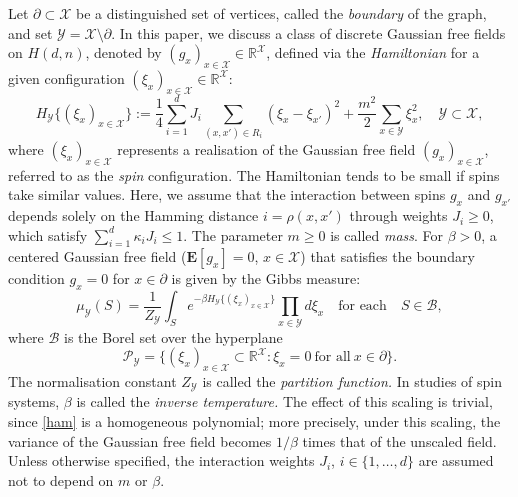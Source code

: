 \documentclass[a4paper,11pt]{article}
\theoremstyle{plain}
\theoremstyle{definition}
\begin{document}
Let $\partial\subset \mathcal{X}$ be a distinguished set
of vertices, called the {\it boundary} of the graph,
and set $\mathcal{Y}=\mathcal{X}\setminus\partial$.
In this paper, we discuss a class of discrete Gaussian
free fields on $H(d,n)$, denoted by
$(g_x)_{x\in\mathcal{X}}\in\mathbb{R}^{\mathcal X}$,
defined via the {\it Hamiltonian}
for a given configuration
$(\xi_x)_{x\in\mathcal{X}}\in\mathbb{R}^\mathcal{X}$:
\begin{equation}\label{ham}
  H_\mathcal{Y}\{(\xi_x)_{x\in\mathcal{X}}\}
  :=\frac{1}{4}\sum_{i=1}^dJ_i\sum_{(x,x')\in R_i}
  (\xi_x-\xi_{x'})^2
  +\frac{m^2}{2}\sum_{x\in \mathcal{Y}}\xi_x^2,
  \quad \mathcal{Y} \subset \mathcal{X},
\end{equation}
where $(\xi_x)_{x\in\mathcal{X}}$
represents a realisation of the Gaussian
free field $(g_x)_{x\in\mathcal{X}}$, referred to as
the {\it spin} configuration. The Hamiltonian tends to
be small if spins take similar values. Here, we assume that
the interaction between spins $g_x$ and $g_{x'}$
depends solely on the Hamming distance
$i=\rho(x,x')$ through weights $J_i\ge 0$, which satisfy
$\sum_{i=1}^d \kappa_i J_i\le 1$. The parameter $m\ge 0$
is called {\it mass}. For $\beta>0$, a centered Gaussian
free field ($\mathbf{E}[g_x]=0$, $x\in\mathcal{X}$) 
that satisfies the boundary condition $g_x=0$ for
$x\in\partial$ is given by the Gibbs measure:
\begin{equation}\label{gibbs}
  \mu_\mathcal{Y}(S)=\frac{1}{Z_\mathcal{Y}}\int_S
  e^{-\beta H_\mathcal{Y}\{(\xi_x)_{x\in\mathcal{X}}\}}
  \prod_{x\in\mathcal{Y}} d\xi_x
  \quad \text{for~each} \quad S\in\mathcal{B},
\end{equation}
where $\mathcal{B}$ is the Borel set over the hyperplane
\begin{equation}\label{plane}
  \mathcal{P}_\mathcal{Y}=\{(\xi_x)_{x\in\mathcal{X}}\subset
  \mathbb{R}^\mathcal{X}:\xi_x=0~\text{for~all}~x\in\partial\}.
\end{equation}
The normalisation constant $Z_\mathcal{Y}$ is called
the {\it partition function.} In studies of spin systems,
$\beta$ is called the {\it inverse temperature.}
The effect of this scaling is trivial, since \eqref{ham}
is a homogeneous polynomial; more precisely, under this
scaling, the variance of the Gaussian free field becomes
$1/\beta$ times
that of the unscaled field. Unless otherwise specified,
the interaction weights $J_i$, $i\in\{1,\ldots,d\}$ are
assumed not to depend on $m$ or $\beta$.
\end{document}
